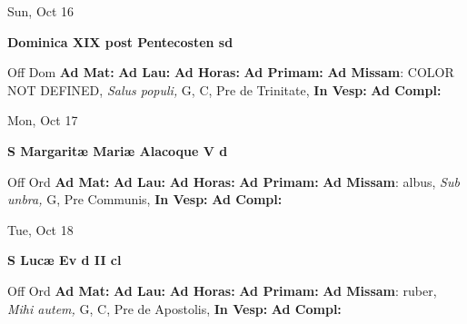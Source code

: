 \documentclass[10pt]{memoir}
\begin{document}
\begin{center}
\begin{minipage}{3.5in}
\vspace{2em}
\begin{center}Sun, Oct 16
\end{center}
\textbf{ \large Dominica XIX post Pentecosten
\textnormal{\normalsize sd}}

\begin{justify}Off Dom
\textbf{Ad Mat: }
\textbf{Ad Lau: }
\textbf{Ad Horas: }
\textbf{Ad Primam: }\textbf{Ad Missam}: COLOR NOT DEFINED, \textit{Salus populi,} G, C, Pre de Trinitate, 
\textbf{In Vesp: }
\textbf{Ad Compl: }
\end{justify}
\end{minipage}
\end{center}

\begin{center}
\begin{minipage}{3.5in}
\vspace{2em}
\begin{center}Mon, Oct 17
\end{center}
\textbf{ \large S Margaritæ Mariæ Alacoque V
\textnormal{\normalsize d}}

\begin{justify}Off Ord
\textbf{Ad Mat: }
\textbf{Ad Lau: }
\textbf{Ad Horas: }
\textbf{Ad Primam: }\textbf{Ad Missam}: albus, \textit{Sub unbra,} G, Pre Communis, 
\textbf{In Vesp: }
\textbf{Ad Compl: }
\end{justify}
\end{minipage}
\end{center}

\begin{center}
\begin{minipage}{3.5in}
\vspace{2em}
\begin{center}Tue, Oct 18
\end{center}
\textbf{ \large S Lucæ Ev
\textnormal{\normalsize d II cl}}

\begin{justify}Off Ord
\textbf{Ad Mat: }
\textbf{Ad Lau: }
\textbf{Ad Horas: }
\textbf{Ad Primam: }\textbf{Ad Missam}: ruber, \textit{Mihi autem,} G, C, Pre de Apostolis, 
\textbf{In Vesp: }
\textbf{Ad Compl: }
\end{justify}
\end{minipage}
\end{center}
\end{document}

